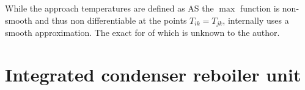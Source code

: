     While the approach temperatures are defined as
    AS the $\max$ function is non-smooth and thus non differentiable at the points $T_{ik} = T_{jk}$, \gproms internally uses a smooth
    approximation. The exact for of which is unknown to the author.

\section{Integrated condenser reboiler unit}

%	
%		
%		




